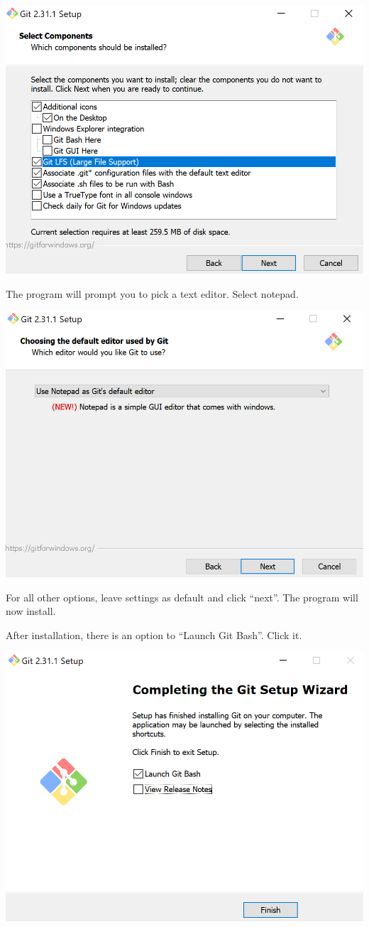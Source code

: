 \documentclass[
]{book}
\begin{document}
\includegraphics{img/git1.png}

The program will prompt you to pick a text editor. Select notepad.

\includegraphics{img/git2.png}

For all other options, leave settings as default and click ``next''. The program will now install.

After installation, there is an option to ``Launch Git Bash''. Click it.

\includegraphics{img/git3.png}
\end{document}

